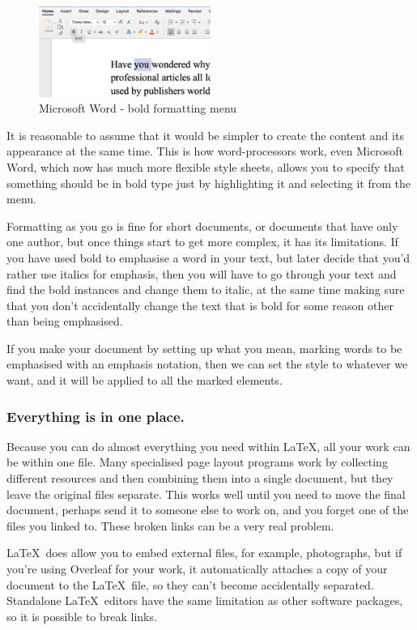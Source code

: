 \documentclass[12pt]{extarticle}
\begin{document}
\begin{figure}
\centering
\includegraphics[width=0.50\textwidth]{Word Menu Bar.png}
\caption{Microsoft Word - bold formatting menu}
\end{figure}It is reasonable to assume that it would be simpler to create the content and its appearance at the same time. This is how word-processors work, even Microsoft Word, which now has much more flexible style sheets, allows you to specify that something should be in bold type just by highlighting it and selecting it from the menu.

Formatting as you go is fine for short documents, or documents that have only one author, but once things start to get more complex, it has its limitations. If you have used bold to emphasise a word in your text, but later decide that you'd rather use italics for emphasis, then you will have to go through your text and find the bold instances and change them to italic, at the same time making sure that you don't accidentally change the text that is bold for some reason other than being emphasised.

If you make your document by setting up what you mean, marking words to be emphasised with an emphasis notation, then we can set the style to whatever we want, and it will be applied to all the marked elements.
\subsubsection{Everything is in one place.}
Because you can do almost everything you need within \LaTeX, all your work can be within one file. Many specialised page layout programs work by collecting different resources and then combining them into a single document, but they leave the original files separate. This works well until you need to move the final document, perhaps send it to someone else to work on, and you forget one of the files you linked to. These broken links can be a very real problem.

\LaTeX\ does allow you to embed external files, for example, photographs, but if you're using Overleaf for your work, it automatically attaches a copy of your document to the \LaTeX\ file, so they can't become accidentally separated. Standalone \LaTeX\ editors have the same limitation as other software packages, so it is possible to break links.
\end{document}

